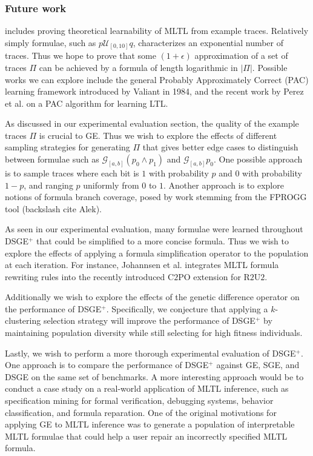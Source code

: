\documentclass[runningheads]{llncs}
\begin{document}
\subsubsection{Future work} includes proving theoretical learnability of MLTL from example traces. 
Relatively simply formulae, such as $p \mathcal{U}_[0, 10] q$, characterizes an exponential number of traces. 
Thus we hope to prove that some $(1+\epsilon)$ approximation of a set of traces $\Pi$ can be achieved by a formula of length logarithmic in $|\Pi|$. 
Possible works we can explore include the general Probably Approximately Correct (PAC) learning framework introduced by Valiant \cite{Valiant_PAC} in 1984, and the recent work by Perez et al. \cite{Perez_Somenzi_Trivedi_2023} on a PAC algorithm for learning LTL.

As discussed in our experimental evaluation section, the quality of the example traces $\Pi$ is crucial to GE. 
Thus we wish to explore the effects of different sampling strategies for generating $\Pi$ that gives better edge cases to distinguish between formulae such as $\mathcal{G}_[a, b] (p_0 \land p_1)$ and $\mathcal{G}_[a, b] p_0$.
One possible approach is to sample traces where each bit is $1$ with probability $p$ and $0$ with probability $1-p$, and ranging $p$ uniformly from $0$ to $1$. 
Another approach is to explore notions of formula branch coverage, posed by work stemming from the FPROGG tool (backslash cite Alek). 

As seen in our experimental evaluation, many formulae were learned throughout DSGE$^+$ that could be simplified to a more concise formula.
Thus we wish to explore the effects of applying a formula simplification operator to the population at each iteration.
For instance, Johannsen et al. \cite{Johannsen_Jones_Kempa_Rozier_Zhang_2023} integrates MLTL formula rewriting rules into the recently introduced C$2$PO extension for R$2$U$2$.

Additionally we wish to explore the effects of the genetic difference operator on the performance of DSGE$^+$. 
Specifically, we conjecture that applying a $k$-clustering selection strategy will improve the performance of DSGE$^+$ by maintaining population diversity while still selecting for high fitness individuals.

Lastly, we wish to perform a more thorough experimental evaluation of DSGE$^+$. One approach is to compare the performance of DSGE$^+$ against GE, SGE, and DSGE on the same set of benchmarks.
A more interesting approach would be to conduct a case study on a real-world application of MLTL inference, such as specification mining for formal verification, debugging systems, behavior classification, and formula reparation. 
One of the original motivations for applying GE to MLTL inference was to generate a population of interpretable MLTL formulae that could help a user repair an incorrectly specified MLTL formula.



%
%
%
\newpage


%
\end{document}
